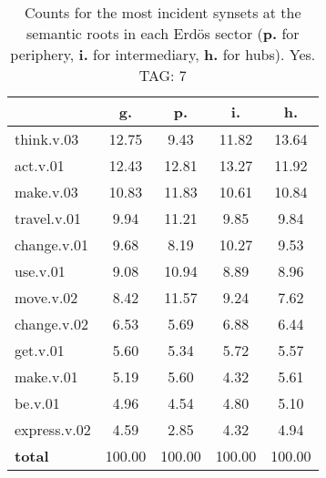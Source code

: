 \begin{table}[h!]
\begin{center}
\begin{tabular}{| l || c | c | c | c |}\hline
 & {\bf g.} & {\bf p.} & {\bf i.} & {\bf h.} \\\hline\hline
think.v.03 & 12.75  & 9.43  & 11.82  & 13.64 \\\hline
act.v.01 & 12.43  & 12.81  & 13.27  & 11.92 \\\hline
make.v.03 & 10.83  & 11.83  & 10.61  & 10.84 \\\hline
travel.v.01 & 9.94  & 11.21  & 9.85  & 9.84 \\\hline
change.v.01 & 9.68  & 8.19  & 10.27  & 9.53 \\\hline
use.v.01 & 9.08  & 10.94  & 8.89  & 8.96 \\\hline
move.v.02 & 8.42  & 11.57  & 9.24  & 7.62 \\\hline
change.v.02 & 6.53  & 5.69  & 6.88  & 6.44 \\\hline
get.v.01 & 5.60  & 5.34  & 5.72  & 5.57 \\\hline
make.v.01 & 5.19  & 5.60  & 4.32  & 5.61 \\\hline
be.v.01 & 4.96  & 4.54  & 4.80  & 5.10 \\\hline
express.v.02 & 4.59  & 2.85  & 4.32  & 4.94 \\\hline\hline
{{\bf total}} & 100.00  & 100.00  & 100.00  & 100.00 \\\hline
\end{tabular}
\caption{Counts for the most incident synsets at the semantic roots in each Erd\"os sector ({\bf p.} for periphery, {\bf i.} for intermediary, {\bf h.} for hubs). Yes. TAG: 7}
\end{center}
\end{table}